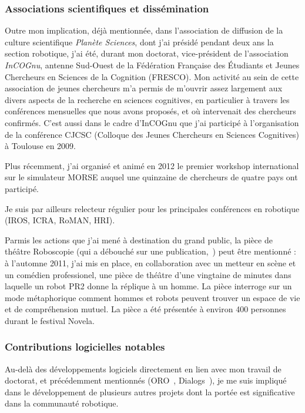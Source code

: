\documentclass[a4paper]{article}
\begin{document}
\subsubsection{Associations scientifiques et dissémination}

Outre mon implication, déjà mentionnée, dans l'association de diffusion de la
culture scientifique \emph{Planète
Sciences}, dont j'ai présidé pendant deux ans la section robotique, j'ai été,
durant mon doctorat, vice-président de l'association \emph{InCOGnu}, antenne
Sud-Ouest de la Fédération Française des Étudiants et Jeunes Chercheurs en
Sciences de la Cognition (FRESCO). Mon activité au sein de cette association de
jeunes chercheurs m'a permis de m'ouvrir assez largement aux divers aspects de
la recherche en sciences cognitives, en particulier à travers les conférences
mensuelles que nous avons proposés, et où intervenait des chercheurs confirmés.
C'est aussi dans le cadre d'InCOGnu que j'ai participé à l'organisation de la
conférence CJCSC (Colloque des Jeunes Chercheurs en Sciences Cognitives) à
Toulouse en 2009.

Plus récemment, j'ai organisé et animé en 2012 le premier workshop international
sur le simulateur MORSE auquel une quinzaine de chercheurs de quatre pays ont
participé.

Je suis par ailleurs relecteur régulier pour les principales conférences en
robotique (IROS, ICRA, RoMAN, HRI).

Parmis les actions que j'ai mené à destination du grand public, la pièce de
théâtre Roboscopie (qui a débouché sur une
publication,~\cite{lemaignan2012roboscopie}) peut être mentionné : à l'automne
2011, j'ai mis en place, en collaboration avec un metteur en scène et un
comédien professionel, une pièce de théâtre d'une vingtaine de minutes dans
laquelle un robot PR2 donne la réplique à un homme. La pièce interroge sur un
mode métaphorique comment hommes et robots peuvent trouver un espace de vie et
de compréhension mutuel. La pièce a été présentée à environ 400 personnes durant
le festival Novela.

\subsubsection{Contributions logicielles notables}

Au-delà des développements logiciels directement en lien avec mon travail de
doctorat, et précédemment mentionnés (ORO~\cite{Lemaignan2010}, {\sc
Dialogs}~\cite{Lemaignan2011a}), je me suis impliqué dans le développement de
plusieurs autres projets dont la portée est significative dans la communauté
robotique.
\end{document}
